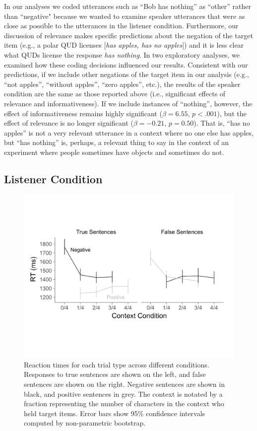 \documentclass[man, floatsintext, noapacite]{apa6}
\begin{document}
In our analyses we coded utterances such as ``Bob has nothing'' as ``other'' rather than ``negative" because we wanted to examine speaker utterances that were as close as possible to the utterances in the listener condition. Furthermore, our discussion of relevance makes specific predictions about the negation of the target item (e.g., a polar QUD licenses [\textit{has apples, has no apples}]) and it is less clear what QUDs license the response \textit{has nothing}. In two exploratory analyses, we examined how these coding decisions influenced our results. Consistent with our predictions, if we include other negations of the target item in our analysis (e.g., ``not apples'', ``without apples'', ``zero apples'', etc.), the results of the speaker condition are the same as those reported above (i.e., significant effects of relevance and informativeness). If we include instances of ``nothing'', however, the effect of informativeness remains highly significant ($\beta= 6.55$, $p< .001$), but the effect of relevance is no longer significant ($\beta= -0.21$, $p = 0.50$). That is, ``has no apples'' is not a very relevant utterance in a context where no one else has apples, but ``has nothing'' is, perhaps, a relevant thing to say in the context of an experiment where people sometimes have objects and sometimes do not. 

\subsection{Listener Condition}

\begin{figure}[t]
\begin{center} 
\includegraphics[width=6in]{figures/rts_mod2.pdf}
\caption{\label{fig:listenerrt} Reaction times for each trial type across different conditions. Responses to true sentences are shown on the left, and false sentences are shown on the right.  Negative sentences are shown in black, and positive sentences in grey.  The context is notated by a fraction representing the number of characters in the context who held target items. Error bars show 95\% confidence intervals computed by non-parametric bootstrap.}
\vspace{-.5cm}
\end{center} 
\end{figure}
\end{document}
